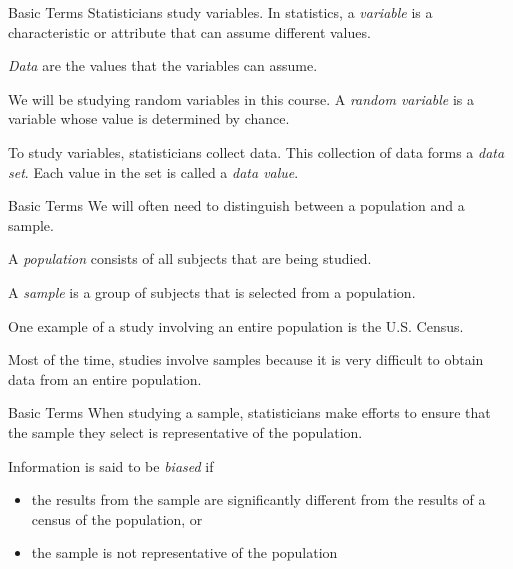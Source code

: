 \documentclass[t]{beamer}
\newcommand{\?}{\stackrel{?}{=}}
\begin{document}
	\begin{frame}{Basic Terms}
		Statisticians study variables. In statistics, a \textit{variable} is a characteristic or attribute that can assume different values. \pause
		
		\textit{Data} are the values that the variables can assume. \pause
		
		We will be studying random variables in this course. A \textit{random variable} is a variable whose value is determined by chance. \pause
		
		To study variables, statisticians collect data. This collection of data forms a \textit{data set}. Each value in the set is called a \textit{data value}.
	\end{frame}

	\begin{frame}{Basic Terms}
		We will often need to distinguish between a population and a sample. \pause
		
		A \textit{population} consists of all subjects that are being studied. \pause
		
		A \textit{sample} is a group of subjects that is selected from a population. \pause
		
		One example of a study involving an entire population is the U.S. Census. \pause
		
		Most of the time, studies involve samples because it is very difficult to obtain data from an entire population.
	\end{frame}

	\begin{frame}{Basic Terms}
		When studying a sample, statisticians make efforts to ensure that the sample they select is representative of the population. \pause
		
		Information is said to be \textit{biased} if \pause \begin{itemize}
			\item the results from the sample are significantly different from the results of a census of the population, or
			\item the sample is not representative of the population
		\end{itemize}
	\end{frame}
\end{document}

